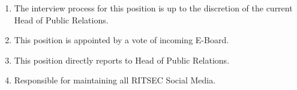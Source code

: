 
\begin{enumerate}
  \item The interview process for this position is up to the discretion of the current Head of Public Relations.
  \item This position is appointed by a vote of incoming E-Board.
  \item This position directly reports to Head of Public Relations.
  \item Responsible for maintaining all RITSEC Social Media. 
\end{enumerate}
